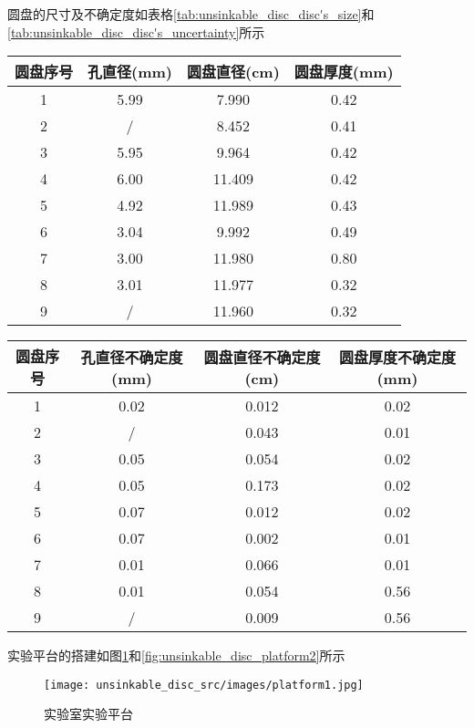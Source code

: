 \documentclass[UTF8]{gapd}
\begin{document}
圆盘的尺寸及不确定度如表格\ref{tab:unsinkable_disc_disc's_size}和\ref{tab:unsinkable_disc_disc's_uncertainty}所示
\begin{table*}[htbp]
    \centering
    \begin{tabular}{cccc}
        \hline
         圆盘序号&孔直径(mm)&圆盘直径(cm)&圆盘厚度(mm)\\
        \hline
         1&5.99&7.990&0.42\\
         2&/&8.452&0.41\\
         3&5.95&9.964&0.42\\
         4&6.00&11.409&0.42\\
         5&4.92&11.989&0.43\\
         6&3.04&9.992&0.49\\
         7&3.00&11.980&0.80\\
         8&3.01&11.977&0.32\\
         9&/&11.960&0.32\\
         \hline
    \end{tabular}
    \caption{圆盘尺寸}
    \label{tab:unsinkable_disc_disc's_size}
\end{table*}
\begin{table*}[htbp]
    \centering
    \begin{tabular}{cccc}
        \hline
         圆盘序号&孔直径不确定度(mm)&圆盘直径不确定度(cm)&圆盘厚度不确定度(mm)\\
        \hline
         1&0.02&0.012&0.02\\
         2&/&0.043&0.01\\
         3&0.05&0.054&0.02\\
         4&0.05&0.173&0.02\\
         5&0.07&0.012&0.02\\
         6&0.07&0.002&0.01\\
         7&0.01&0.066&0.01\\
         8&0.01&0.054&0.56\\
         9&/&0.009&0.56\\
         \hline
    \end{tabular}
    \caption{圆盘尺寸不确定度}
    \label{tab:unsinkable_disc_disc's_uncertainty}
\end{table*}

实验平台的搭建如图\ref{fig:unsinkable_disc_platform1}和\ref{fig:unsinkable_disc_platform2}所示
\begin{figure}[!htbp]%
  \centering
  \texttt{[image: unsinkable\_disc\_src/images/platform1.jpg]}
  \caption{实验室实验平台}
  \label{fig:unsinkable_disc_platform1}%
\end{figure}
\end{document}
